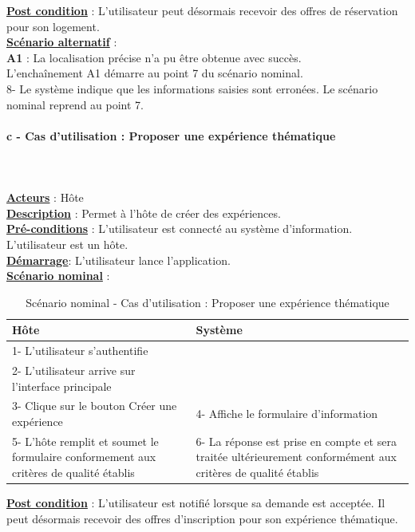 \begin{flushleft}
{\underline{\textbf{Post condition}}} : L’utilisateur peut désormais recevoir des offres de réservation pour son logement.
\\\underline{\textbf{Scénario alternatif}} :
\\\textbf{A1} : La localisation précise n’a pu être obtenue avec succès.
\\L'enchaînement A1 démarre au point 7 du scénario nominal.
\\8- Le système indique que les informations saisies sont erronées. Le scénario nominal reprend au point 7.
\end{flushleft}

\newpage
\paragraph{c - Cas d'utilisation : Proposer une expérience thématique} 
$ $\\$ $\\\underline{\textbf{Acteurs}} : Hôte
\\\underline{\textbf{Description}} : Permet à l'hôte de créer des expériences.
\\\underline{\textbf{Pré-conditions}} : L'utilisateur est connecté au système d’information. L’utilisateur est un hôte.
\\\underline{\textbf{Démarrage}}: L’utilisateur lance l’application.
\\\underline{\textbf{Scénario nominal}} :

\begin{table}[H]
\begin{center}
\begin{tabular}{|p{8cm}|p{8cm}|}
\hline
Hôte & Système\\
\hline
1- L’utilisateur s’authentifie & $ $\\
\hline
2- L’utilisateur arrive sur l’interface principale & $ $\\
\hline	
3- Clique sur le bouton Créer une expérience & 4- Affiche le formulaire d’information\\
\hline
5- L'hôte remplit et soumet le formulaire conformement aux critères de qualité établis & 6- La réponse est prise en compte et sera traitée ultérieurement conformément aux critères de qualité établis\\
\hline
\end{tabular}
\caption{Scénario nominal - Cas d'utilisation : Proposer une expérience thématique}
\end{center}
\end{table}
\begin{flushleft}
\underline{\textbf{Post condition}} : L’utilisateur est notifié lorsque sa demande est acceptée. Il peut désormais recevoir des offres d’inscription pour son expérience thématique.
\end{flushleft}

